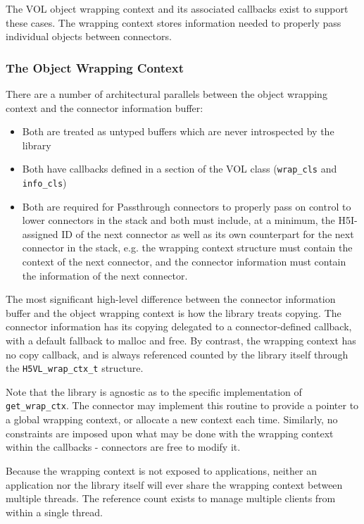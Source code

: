 \documentclass{article}
\begin{document}
The VOL object wrapping context and its associated callbacks exist to support these cases. The wrapping context stores information needed to properly pass individual objects between connectors.

\subsubsection{The Object Wrapping Context}

There are a number of architectural parallels between the object wrapping context and the connector information buffer:

\begin{itemize}
    \item Both are treated as untyped buffers which are never introspected by the library

    \item Both have callbacks defined in a section of the VOL class (\texttt{wrap\_cls} and \texttt{info\_cls})

    \item Both are required for Passthrough connectors to properly pass on control to lower connectors in the stack and both must include, at a minimum, the H5I-assigned ID of the next connector as well as its own counterpart for the next connector in the stack, e.g. the wrapping context structure must contain the context of the next connector, and the connector information must contain the information of the next connector.
\end{itemize}

The most significant high-level difference between the connector information buffer and the object wrapping context is how the library treats copying. The connector information has its copying delegated to a connector-defined callback, with a default fallback to malloc and free. By contrast, the wrapping context has no copy callback, and is always referenced counted by the library itself through the \texttt{H5VL\_wrap\_ctx\_t} structure.

Note that the library is agnostic as to the specific implementation of \texttt{get\_wrap\_ctx}. The connector may implement this routine to provide a pointer to a global wrapping context, or allocate a new context each time. Similarly, no constraints are imposed upon what may be done with the wrapping context within the callbacks - connectors are free to modify it.

Because the wrapping context is not exposed to applications, neither an application nor the library itself will ever share the wrapping context between multiple threads. The reference count exists to manage multiple clients from within a single thread.
\end{document}
